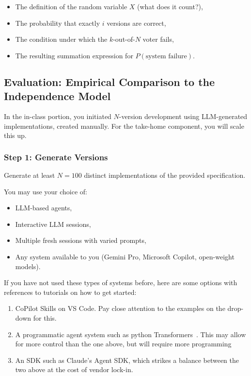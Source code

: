 \begin{itemize}
  \item The definition of the random variable $X$ (what does it count?),
  \item The probability that exactly $i$ versions are correct,
  \item The condition under which the $k$-out-of-$N$ voter fails,
  \item The resulting summation expression for $P(\text{system failure})$.
\end{itemize}

\subsection{Evaluation: Empirical Comparison to the Independence Model}

In the in-class portion, you initiated $N$-version development using LLM-generated implementations, created manually.
For the take-home component, you will scale this up.

\subsubsection{Step 1: Generate Versions}

Generate at least $N = 100$ distinct implementations of the provided specification.

You may use your choice of:

\begin{itemize}
  \item LLM-based agents,
  \item Interactive LLM sessions,
  \item Multiple fresh sessions with varied prompts,
  \item Any system available to you (\eg Gemini Pro, Microsoft Copilot, open-weight models).
\end{itemize}

If you have not used these types of systems before, here are some options with references to tutorials on how to get started:

\begin{enumerate}
    \item CoPilot Skills on VS Code\cite{copilot-documentation}. Pay close attention to the examples on the drop-down for this.

    \item A programmatic agent system such as python Transformers~\cite{transformers-tutorial}. This may allow for more control than the one above, but will require more programming

    \item An SDK such as Claude's Agent SDK\cite{claude-agent-sdk}, which strikes a balance between the two above at the cost of vendor lock-in.
\end{enumerate}

